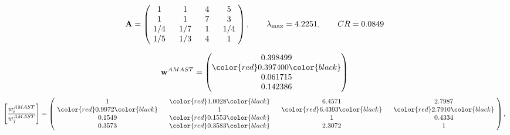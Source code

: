 \begin{example}
\begin{equation*}
\mathbf{A} =
\begin{pmatrix}
$\,\,$ 1 $\,\,$ & $\,\,$1$\,\,$ & $\,\,$4$\,\,$ & $\,\,$5 $\,\,$ \\
$\,\,$ 1 $\,\,$ & $\,\,$ 1 $\,\,$ & $\,\,$7$\,\,$ & $\,\,$3 $\,\,$ \\
$\,\,$ 1/4$\,\,$ & $\,\,$ 1/7$\,\,$ & $\,\,$ 1 $\,\,$ & $\,\,$ 1/4 $\,\,$ \\
$\,\,$ 1/5$\,\,$ & $\,\,$ 1/3$\,\,$ & $\,\,$4$\,\,$ & $\,\,$ 1  $\,\,$ \\
\end{pmatrix},
\qquad
\lambda_{\max} =
4.2251,
\qquad
CR = 0.0849
\end{equation*}

\begin{equation*}
\mathbf{w}^{AMAST} =
\begin{pmatrix}
0.398499\\
\color{red} 0.397400\color{black} \\
0.061715\\
0.142386
\end{pmatrix}\end{equation*}
\begin{equation*}
\left[ \frac{{w}^{AMAST}_i}{{w}^{AMAST}_j} \right] =
\begin{pmatrix}
$\,\,$ 1 $\,\,$ & $\,\,$\color{red} 1.0028\color{black} $\,\,$ & $\,\,$6.4571$\,\,$ & $\,\,$2.7987$\,\,$ \\
$\,\,$\color{red} 0.9972\color{black} $\,\,$ & $\,\,$ 1 $\,\,$ & $\,\,$\color{red} 6.4393\color{black} $\,\,$ & $\,\,$\color{red} 2.7910\color{black}   $\,\,$ \\
$\,\,$0.1549$\,\,$ & $\,\,$\color{red} 0.1553\color{black} $\,\,$ & $\,\,$ 1 $\,\,$ & $\,\,$0.4334 $\,\,$ \\
$\,\,$0.3573$\,\,$ & $\,\,$\color{red} 0.3583\color{black} $\,\,$ & $\,\,$2.3072$\,\,$ & $\,\,$ 1  $\,\,$ \\
\end{pmatrix},
\end{equation*}


\end{example}
